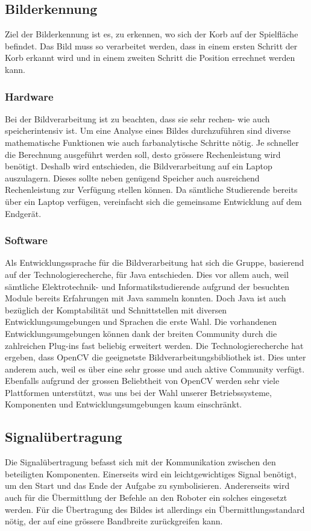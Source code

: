 \subsection{Bilderkennung}
Ziel der Bilderkennung ist es, zu erkennen, wo sich der Korb auf der 
Spielfläche befindet. Das Bild muss so verarbeitet werden, dass in einem 
ersten Schritt der Korb erkannt wird und in einem zweiten Schritt die Position 
errechnet werden kann.
\subsubsection{Hardware}
Bei der Bildverarbeitung ist zu beachten, dass sie sehr rechen- wie auch 
speicherintensiv ist. Um eine Analyse eines Bildes durchzuführen sind diverse 
mathematische Funktionen wie auch farbanalytische Schritte nötig. Je schneller 
die Berechnung ausgeführt werden soll, desto grössere Rechenleistung wird 
benötigt. Deshalb wird entschieden, die Bildverarbeitung auf ein Laptop 
auszulagern. Dieses sollte neben genügend Speicher auch ausreichend 
Rechenleistung zur Verfügung stellen können. Da sämtliche Studierende bereits 
über ein Laptop verfügen, vereinfacht sich die gemeinsame Entwicklung auf 
dem Endgerät.

\subsubsection{Software}
Als Entwicklungssprache für die Bildverarbeitung hat sich die Gruppe, 
basierend auf der Technologierecherche, für Java entschieden. Dies vor allem 
auch, weil sämtliche Elektrotechnik- und Informatikstudierende aufgrund der 
besuchten Module bereits Erfahrungen mit Java sammeln konnten. Doch Java ist 
auch bezüglich der Komptabilität und Schnittstellen mit diversen 
Entwicklungsumgebungen und Sprachen die erste Wahl. Die vorhandenen 
Entwicklungsumgebungen können dank der breiten Community durch die zahlreichen 
Plug-ins fast beliebig erweitert werden.
Die Technologierecherche hat ergeben, dass OpenCV die geeignetste 
Bildverarbeitungsbibliothek ist. Dies unter anderem auch, weil es über eine 
sehr grosse und auch aktive Community verfügt. Ebenfalls aufgrund der grossen 
Beliebtheit von OpenCV werden sehr viele Plattformen unterstützt, was uns bei 
der Wahl unserer Betriebssysteme, Komponenten und Entwicklungsumgebungen kaum 
einschränkt.

\subsection{Signalübertragung}
Die Signalübertragung befasst sich mit der Kommunikation zwischen den 
beteiligten Komponenten. Einerseits wird ein leichtgewichtiges Signal 
benötigt, um den Start und das Ende der Aufgabe zu symbolisieren. Andererseits 
wird auch für die Übermittlung der Befehle an den Roboter ein solches 
eingesetzt werden. Für die Übertragung des Bildes ist allerdings ein 
Übermittlungsstandard nötig, der auf eine grössere Bandbreite zurückgreifen kann.

